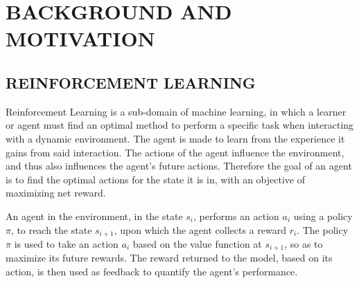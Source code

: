 
\chapter{BACKGROUND AND MOTIVATION} %
%

\section{REINFORCEMENT LEARNING}


Reinforcement Learning is a sub-domain of machine learning, in which a
learner or agent must find an optimal method to perform a specific
task when interacting with a dynamic environment. The agent is made to
learn from the experience it gains from said interaction. The actions
of the agent influence the environment, and thus also influences the
agent's future actions. Therefore the goal of an agent is to find the
optimal actions for the state it is in, with an objective of
maximizing net reward.
%

An agent in the environment, in the state $s_{i} $, performs an action
$a_{i} $ using a policy $\pi$, to reach the state $s_{i+1} $, upon
which the agent collects a reward $r_{i} $. The policy $\pi$ is used
to take an action $a_{i} $ based on the value function at $s_{i+1} $,
so as to maximize its future rewards. The reward returned to the
model, based on its action, is then used as feedback to quantify the
agent's performance.


%

